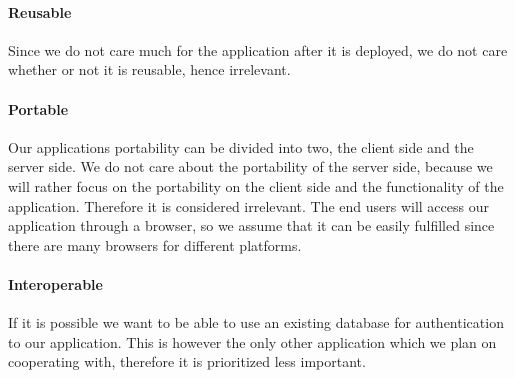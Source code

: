 \paragraph{Reusable}
Since we do not care much for the application after it is deployed, we do not care whether or not it is reusable, hence irrelevant.
\paragraph{Portable}
Our applications portability can be divided into two, the client side and the server side.
We do not care about the portability of the server side, because we will rather focus on the portability on the client side and the functionality of the application.
Therefore it is considered irrelevant.
The end users will access our application through a browser, so we assume that it can be easily fulfilled since there are many browsers for different platforms. \cite{chrome10}\cite{firefox}
\paragraph{Interoperable}
If it is possible we want to be able to use an existing database for authentication to our application.
This is however the only other application which we plan on cooperating with, therefore it is prioritized less important.
